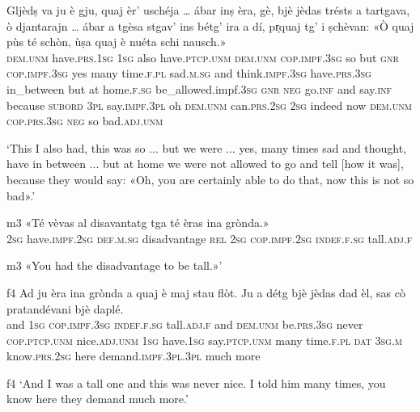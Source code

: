 \begin{linenumbers}
	\gll Gljèdṣ va ju è gju, quaj èr’ uschéja … ábar inṣ èra, gè, bjè jèdas trésts a tartgava, ò djantarajn … ábar a tgèsa stgav’ ins bétg’ ira a dí, pr̩quaj tg’ i ṣchèvan: «Ò quaj pùs té schòn, ùṣa quaj è nuéta schi nausch.»\\
	\textsc{dem.unm} have.\textsc{prs.1sg} \textsc{1sg} also have.\textsc{ptcp.unm} \textsc{dem.unm} \textsc{cop.impf.3sg} so {} but \textsc{gnr} \textsc{cop.impf.3sg} yes many time.\textsc{f.pl} sad.\textsc{m.sg} and think.\textsc{impf.3sg} have.\textsc{prs.3sg} in\_between {} but at home.\textsc{f.sg} be\_allowed.impf.\textsc{3sg} \textsc{gnr} \textsc{neg} go.\textsc{inf} and say.\textsc{inf} because \textsc{subord} \textsc{3pl} say.\textsc{impf.3pl} oh \textsc{dem.unm} can.\textsc{prs.2sg} \textsc{2sg} indeed now \textsc{dem.unm} \textsc{cop.prs.3sg} \textsc{neg} so bad.\textsc{adj.unm}\\
\end{linenumbers}
\medskip
\glt `This I also had, this was so ... but we were ... yes, many times sad and thought, have in between ... but at home we were not allowed to go and tell [how it was], because they would say: «Oh, you are certainly able to do that, now this is not so bad».'
\medskip

\begin{linenumbers}
	\gll  {\ob}m3{\cb} «Té vèvas al disavantatg tga té èras ina grònda.» \\
	{} \textsc{2sg} have.\textsc{impf.2sg} \textsc{def.m.sg} disadvantage \textsc{rel} \textsc{2sg} \textsc{cop.impf.2sg} \textsc{indef.f.sg} tall.\textsc{adj.f} \\
\end{linenumbers}
\medskip
\glt {\ob}m3{\cb}  «You had the disadvantage to be tall.»'
\medskip

\begin{linenumbers}
	\gll {\ob}f4{\cb} Ad ju èra ina grònda a quaj è maj stau flòt. Ju a détg bjè jèdas dad èl, sas cò pratandévani bjè daplé.\\
{} and \textsc{1sg} \textsc{cop.impf.3sg} \textsc{indef.f.sg} tall.\textsc{adj.f} and \textsc{dem.unm} be.\textsc{prs.3sg} never \textsc{cop.ptcp.unm} nice.\textsc{adj.unm} \textsc{1sg} have.\textsc{1sg} say.\textsc{ptcp.unm} many time.\textsc{f.pl} \textsc{dat} \textsc{3sg.m} know.\textsc{prs.2sg} here demand.\textsc{impf.3pl.3pl} much more\\
\end{linenumbers}
\medskip
\glt {\ob}f4{\cb} `And I was a tall one and this was never nice. I told him many times, you know here they demand much more.'
\medskip

